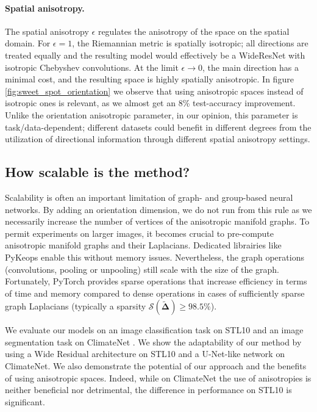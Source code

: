 \documentclass{article}
\begin{document}
\paragraph{Spatial anisotropy.} The spatial anisotropy $\epsilon$ regulates the anisotropy of the space on the spatial domain. For $\epsilon = 1$, the Riemannian metric is spatially isotropic; all directions are treated equally and the resulting model would effectively be a WideResNet with isotropic Chebyshev convolutions. At the limit $\epsilon \to 0$, the main direction has a minimal cost, and the resulting space is highly spatially anisotropic. In figure \ref{fig:sweet_spot_orientation} we observe that using anisotropic spaces instead of isotropic ones is relevant, as we almost get an 8\% test-accuracy improvement. Unlike the orientation anisotropic parameter, in our opinion, this parameter is task/data-dependent; different datasets could benefit in different degrees from the utilization of directional information through different spatial anisotropy settings. 



\subsection{How scalable is the method?}

Scalability is often an important limitation of graph- and group-based neural networks. By adding an orientation dimension, we do not run from this rule as we necessarily increase the number of vertices of the anisotropic manifold graphs. To permit experiments on larger images, it becomes crucial to pre-compute anisotropic manifold graphs and their Laplacians. Dedicated librairies like PyKeops \citep{charlier2020kernel} enable this without memory issues. Nevertheless, the graph operations (convolutions, pooling or unpooling) still scale with the size of the graph. Fortunately, PyTorch provides sparse operations that increase efficiency in terms of time and memory compared to dense operations in cases of sufficiently sparse graph Laplacians (typically a sparsity $\mathcal{S}(\boldsymbol{\tilde{\Delta}}) \geq 98.5\%$). 

We evaluate our models on an image classification task on STL10 \citep{coates2011analysis} and an image segmentation task on ClimateNet \citep{kashinath2021climatenet}. We show the adaptability of our method by using a Wide Residual architecture \citep{zagoruyko2016wide} on STL10 and a U-Net-like network \citep{ronneberger2015u} on ClimateNet. We also demonstrate the potential of our approach and the benefits of using anisotropic spaces. Indeed, while on ClimateNet the use of anisotropies is neither beneficial nor detrimental, the difference in performance on STL10 is significant.
\end{document}
